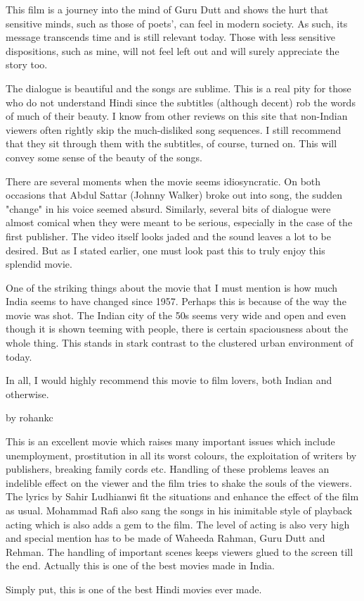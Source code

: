 \documentclass{article}
\begin{document}
This film is a journey into the mind of Guru Dutt and shows the hurt that sensitive minds, such as those of poets', can feel in modern society. As such, its message transcends time and is still relevant today. Those with less sensitive dispositions, such as mine, will not feel left out and will surely appreciate the story too.

The dialogue is beautiful and the songs are sublime. This is a real pity for those who do not understand Hindi since the subtitles (although decent) rob the words of much of their beauty. I know from other reviews on this site that non-Indian viewers often rightly skip the much-disliked song sequences. I still recommend that they sit through them with the subtitles, of course, turned on. This will convey some sense of the beauty of the songs.

There are several moments when the movie seems idiosyncratic. On both occasions that Abdul Sattar (Johnny Walker) broke out into song, the sudden "change" in his voice seemed absurd. Similarly, several bits of dialogue were almost comical when they were meant to be serious, especially in the case of the first publisher. The video itself looks jaded and the sound leaves a lot to be desired. But as I stated earlier, one must look past this to truly enjoy this splendid movie.

One of the striking things about the movie that I must mention is how much India seems to have changed since 1957. Perhaps this is because of the way the movie was shot. The Indian city of the 50s seems very wide and open and even though it is shown teeming with people, there is certain spaciousness about the whole thing. This stands in stark contrast to the clustered urban environment of today.

In all, I would highly recommend this movie to film lovers, both Indian and otherwise.

by rohankc

This is an excellent movie which raises many important issues which include unemployment, prostitution in all its worst colours, the exploitation of writers by publishers, breaking family cords etc. Handling of these problems leaves an indelible effect on the viewer and the film tries to shake the souls of the viewers. The lyrics by Sahir Ludhianwi fit the situations and enhance the effect of the film as usual. Mohammad Rafi also sang the songs in his inimitable style of playback acting which is also adds a gem to the film. The level of acting is also very high and special mention has to be made of Waheeda Rahman, Guru Dutt and Rehman. The handling of important scenes keeps viewers glued to the screen till the end. Actually this is one of the best movies made in India. 

Simply put, this is one of the best Hindi movies ever made.
\end{document}
